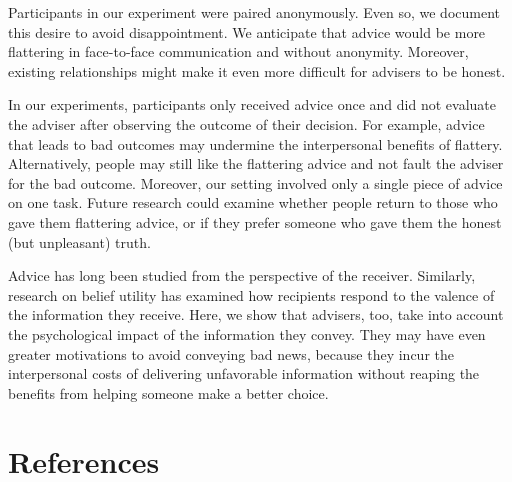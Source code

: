 \documentclass[
  man,
  floatsintext,
  longtable,
  nolmodern,
  notxfonts,
  notimes,
  colorlinks=true,linkcolor=blue,citecolor=blue,urlcolor=blue]{apa7}
\begin{document}
Participants in our experiment were paired anonymously. Even so, we
document this desire to avoid disappointment. We anticipate that advice
would be more flattering in face-to-face communication and without
anonymity. Moreover, existing relationships might make it even more
difficult for advisers to be honest.

In our experiments, participants only received advice once and did not
evaluate the adviser after observing the outcome of their decision. For
example, advice that leads to bad outcomes may undermine the
interpersonal benefits of flattery. Alternatively, people may still like
the flattering advice and not fault the adviser for the bad outcome.
Moreover, our setting involved only a single piece of advice on one
task. Future research could examine whether people return to those who
gave them flattering advice, or if they prefer someone who gave them the
honest (but unpleasant) truth.

Advice has long been studied from the perspective of the receiver.
Similarly, research on belief utility has examined how recipients
respond to the valence of the information they receive. Here, we show
that advisers, too, take into account the psychological impact of the
information they convey. They may have even greater motivations to avoid
conveying bad news, because they incur the interpersonal costs of
delivering unfavorable information without reaping the benefits from
helping someone make a better choice.

\section{References}\label{references}
\end{document}
